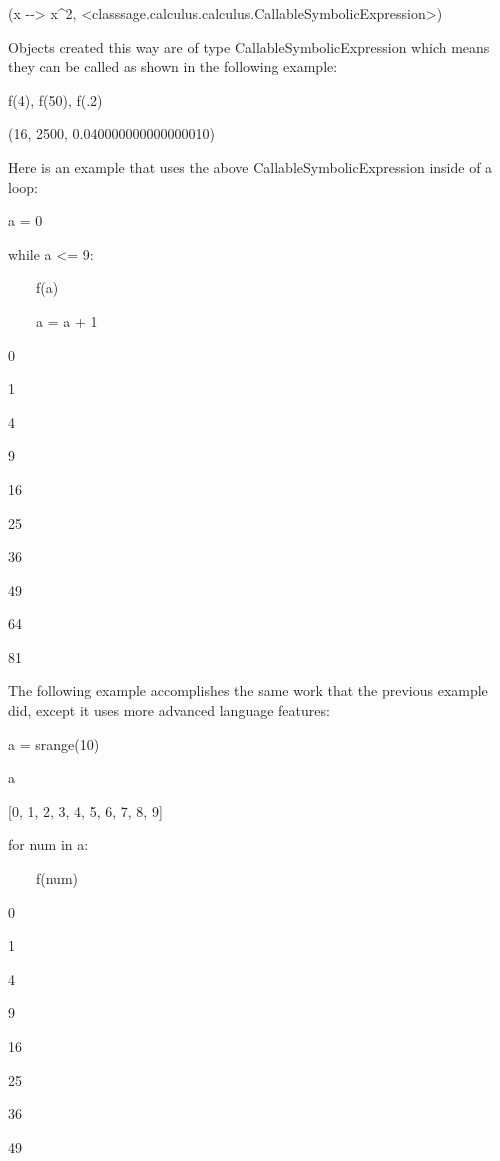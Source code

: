 \documentclass[12pt,twoside]{book}
\begin{document}
{\textbar}

(x {\textbar}{}-{}-{\textgreater} x\^{}2, {\textless}class{\textquotesingle}sage.calculus.calculus.CallableSymbolicExpression{\textquotesingle}{\textgreater})

Objects created this way are of type CallableSymbolicExpression which means they can be called as shown in the following example: 

\bigskip

f(4), f(50), f(.2)

{\textbar}

(16, 2500, 0.040000000000000010)

Here is an example that uses the above CallableSymbolicExpression inside of a loop: 

\bigskip

a = 0

while a {\textless}= 9:

\ \ \ \ f(a)

\ \ \ \ a = a + 1

{\textbar}

0

1

4

9

16

25

36

49

64

81


\bigskip

The following example accomplishes the same work that the previous example did, except it uses more advanced language features: 

\bigskip

a = srange(10)

a

{\textbar}

[0, 1, 2, 3, 4, 5, 6, 7, 8, 9]


\bigskip

for num in a:

\ \ \ \ f(num)

{\textbar}

0

1

4

9

16

25

36

49
\end{document}
